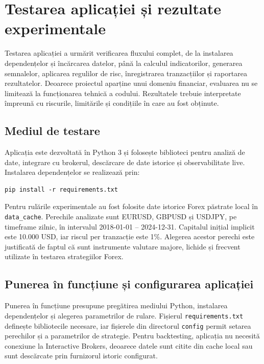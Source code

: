 \chapter{Testarea aplicației și rezultate experimentale}
\label{cap:cap4}

Testarea aplicației a urmărit verificarea fluxului complet, de la instalarea dependențelor și încărcarea datelor, până la calculul indicatorilor, generarea semnalelor, aplicarea regulilor de risc, înregistrarea tranzacțiilor și raportarea rezultatelor. Deoarece proiectul aparține unui domeniu financiar, evaluarea nu se limitează la funcționarea tehnică a codului. Rezultatele trebuie interpretate împreună cu riscurile, limitările și condițiile în care au fost obținute.

\section{Mediul de testare}
\label{cap:cap4:mediu}

Aplicația este dezvoltată în Python 3 și folosește biblioteci pentru analiză de date, integrare cu brokerul, descărcare de date istorice și observabilitate live. Instalarea dependențelor se realizează prin:

\begin{code}
\begin{verbatim}
pip install -r requirements.txt
\end{verbatim}
\caption{Instalarea dependențelor proiectului}
\label{code:install}
\end{code}

Pentru rulările experimentale au fost folosite date istorice Forex păstrate local în \texttt{data\_cache}. Perechile analizate sunt EURUSD, GBPUSD și USDJPY, pe timeframe zilnic, în intervalul 2018-01-01 -- 2024-12-31. Capitalul inițial implicit este 10.000 USD, iar riscul per tranzacție este 1\%. Alegerea acestor perechi este justificată de faptul că sunt instrumente valutare majore, lichide și frecvent utilizate în testarea strategiilor Forex.

\section{Punerea în funcțiune și configurarea aplicației}
\label{cap:cap4:configurare}

Punerea în funcțiune presupune pregătirea mediului Python, instalarea dependențelor și alegerea parametrilor de rulare. Fișierul \texttt{requirements.txt} definește bibliotecile necesare, iar fișierele din directorul \texttt{config} permit setarea perechilor și a parametrilor de strategie. Pentru backtesting, aplicația nu necesită conexiune la Interactive Brokers, deoarece datele sunt citite din cache local sau sunt descărcate prin furnizorul istoric configurat.

